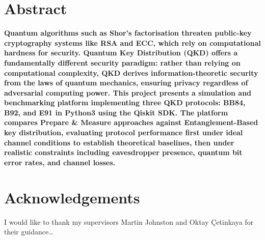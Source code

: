 \documentclass[10pt, a4paper]{report}
\begin{document}

\clearpage
\chapter*{Abstract}

{\fontsize{9}{10}\selectfont\bfseries
Quantum algorithms such as Shor's factorisation threaten public-key cryptography systems like RSA and ECC, which rely on computational hardness for security. Quantum Key Distribution (QKD) offers a fundamentally different security paradigm: rather than relying on computational complexity, QKD derives information-theoretic security from the laws of quantum mechanics, ensuring privacy regardless of adversarial computing power. This project presents a simulation and benchmarking platform implementing three QKD protocols: BB84, B92, and E91 in Python3 using the Qiskit SDK. The platform compares Prepare \& Measure approaches against Entanglement-Based key distribution, evaluating protocol performance first under ideal channel conditions to establish theoretical baselines, then under realistic constraints including eavesdropper presence, quantum bit error rates, and channel losses.\par
}

\clearpage
\chapter*{Acknowledgements}

I would like to thank my supervisors Martin Johnston and Oktay \c{C}etinkaya for their guidance\ldots

\clearpage
\tableofcontents

\clearpage
\listoffigures
{}

\clearpage
\listoftables
{}

\clearpage
\lstlistoflistings
{}

\clearpage
\listofalgorithms
{}
\end{document}
